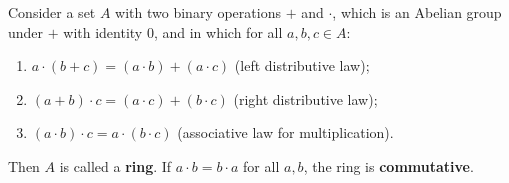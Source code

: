 Consider a set \(A\) with two binary operations \(+\) and \(\cdot\), which is an Abelian group under \(+\) with identity \(0\), and in which for all \(a, b, c \in A\):
\begin{enumerate}
\item[(i)] \(a \cdot (b + c) = (a \cdot b) + (a \cdot c)\) (left distributive law);
\item[(ii)] \((a + b) \cdot c = (a \cdot c) + (b \cdot c)\) (right distributive law);
\item[(iii)] \((a \cdot b) \cdot c = a \cdot (b \cdot c)\) (associative law for multiplication).
\end{enumerate}
Then \(A\) is called a \textbf{ring}. If \(a \cdot b = b \cdot a\) for all \(a, b\), the ring is \textbf{commutative}.